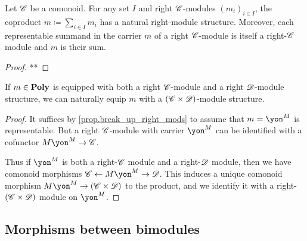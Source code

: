 \documentclass[Book-Poly]{subfiles}
\begin{document}
\begin{proposition}\label{prop.break_up_right_mods}
Let $\mathscr{C}$ be a comonoid. For any set $I$ and right $\mathscr{C}$-modules $(m_i)_{i\in I}$, the coproduct $m\coloneqq \sum_{i\in I}m_i$ has a natural right-module structure. Moreover, each representable summand in the carrier $m$ of a right $\mathscr{C}$-module is itself a right-$\mathscr{C}$ module and $m$ is their sum.
\end{proposition}
\begin{proof}
**
\end{proof}
%
%
%

\begin{proposition}
If $m\in\mathbf{Poly}$ is equipped with both a right $\mathscr{C}$-module and a right $\mathscr{D}$-module structure, we can naturally equip $m$ with a $(\mathscr{C}\times\mathscr{D})$-module structure.
\end{proposition}
\begin{proof}
It suffices by \cref{prop.break_up_right_mods} to assume that $m=\yon^M$ is representable. But a right $\mathscr{C}$-module with carrier $\yon^M$ can be identified with a cofunctor $M\yon^M\to\com{C}$.

Thus if $\yon^M$ is both a right-$\mathscr{C}$ module and a right-$\mathscr{D}$ module, then we have comonoid morphisms $\com{C}\from M\yon^M\to\com{D}$. This induces a unique comonoid morphism $M\yon^M\to(\com{C}\times\com{D})$ to the product, and we identify it with a right-$(\mathscr{C}\times\mathscr{D})$ module on $\yon^M$.
\end{proof}

\subsection{Morphisms between bimodules}
\end{document}
